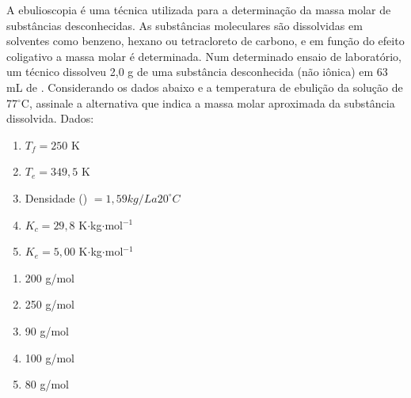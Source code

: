 A ebulioscopia é uma técnica utilizada para a determinação da massa molar de substâncias desconhecidas. As substâncias moleculares são dissolvidas em solventes como benzeno, hexano ou tetracloreto de carbono, e em função do efeito coligativo a massa molar é determinada. Num determinado ensaio de laboratório, um técnico dissolveu 2,0 g de uma substância desconhecida (não iônica) em 63 mL de . Considerando os dados abaixo e a temperatura de ebulição da solução de 77$^\circ$C, assinale a alternativa que indica a massa molar aproximada da substância dissolvida.  
Dados:\begin{enumerate}[label =]
	
	\item $T_f = 250$ K
	\item $T_e = 349,5$ K
	\item Densidade () $= 1,59 kg/L a 20^\circ C$
	\item $K_c = 29,8$ K$\cdot$kg$\cdot$mol$^{-1}$
	\item $K_e = 5,00$ K$\cdot$kg$\cdot$mol$^{-1}$
\end{enumerate}

\begin{enumerate}[label = (\alph*)]
	
	\item 200 g/mol
	\item 250 g/mol
	\item 90 g/mol
	\item 100 g/mol
	\item 80 g/mol
\end{enumerate}
